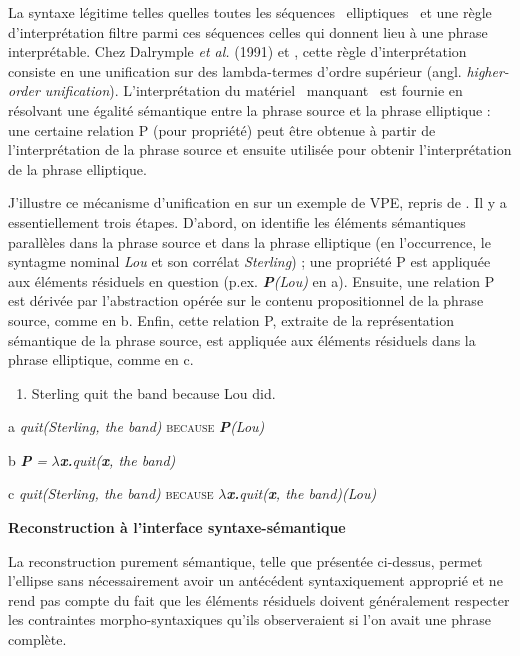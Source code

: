La syntaxe légitime telles quelles toutes les séquences {\guillemotleft}~elliptiques~{\guillemotright} et une règle d'interprétation filtre parmi ces séquences celles qui donnent lieu à une phrase interprétable. Chez Dalrymple \textit{et al.} (1991) et \citet{Dalrymple2005}, cette règle d'interprétation consiste en une unification sur des lambda-termes d'ordre supérieur (angl. \textit{higher-order unification}). L'interprétation du matériel {\guillemotleft}~manquant~{\guillemotright} est fournie en résolvant une égalité sémantique entre la phrase source et la phrase elliptique : une certaine relation P (pour propriété) peut être obtenue à partir de l'interprétation de la phrase source et ensuite utilisée pour obtenir l'interprétation de la phrase elliptique. 

J'illustre ce mécanisme d'unification en  sur un exemple de VPE, repris de \citet{Kennedy2003}. Il y a essentiellement trois étapes. D'abord, on identifie les éléments sémantiques parallèles dans la phrase source et dans la phrase elliptique (en l'occurrence, le syntagme nominal \textit{Lou} et son corrélat \textit{Sterling}) ; une propriété P est appliquée aux éléments résiduels en question (p.ex. \textbf{\textit{P}}\textit{(Lou)} en a). Ensuite, une relation P est dérivée par l'abstraction opérée sur le contenu propositionnel de la phrase source, comme en b. Enfin, cette relation P, extraite de la représentation sémantique de la phrase source, est appliquée aux éléments résiduels dans la phrase elliptique, comme en c.


\begin{enumerate}
\item \label{bkm:Ref305968647}\label{bkm:Ref306029707}Sterling quit the band because Lou did.            


\end{enumerate}
a  \textit{quit(Sterling, the band)} \textsc{because} \textbf{\textit{P}}\textit{(Lou)} 

b  \textbf{\textit{P}}\textit{ =} \textbf{\textit{$\lambda $x.}}\textit{quit(}\textbf{\textit{x}}\textit{, the band)}

c  \textit{quit(Sterling, the band)} \textsc{because} \textbf{\textit{$\lambda $x.}}\textit{quit(}\textbf{\textit{x}}\textit{, the band)}\textit{(Lou)}

{\bfseries
Reconstruction à l'interface syntaxe-sémantique}

La reconstruction purement sémantique, telle que présentée ci-dessus, permet l'ellipse sans nécessairement avoir un antécédent syntaxiquement approprié et ne rend pas compte du fait que les éléments résiduels doivent généralement respecter les contraintes morpho-syntaxiques qu'ils observeraient si l'on avait une phrase complète. 

